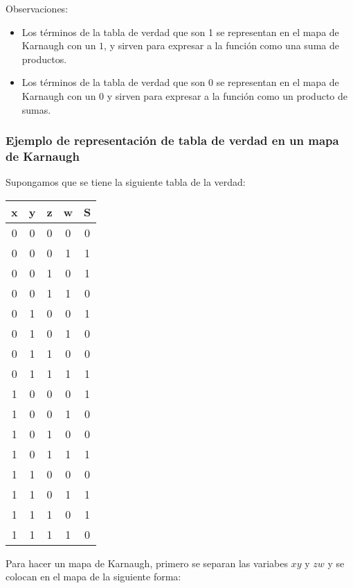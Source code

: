 \begin{mdframed}[backgroundcolor=gray!10,linewidth=0]
    Observaciones:
    \begin{itemize}
        \item Los términos de la tabla de verdad que son 1 se representan en el mapa de Karnaugh con un $1$, y sirven para expresar a la función como una suma de productos.
        \item Los términos de la tabla de verdad que son 0 se representan en el mapa de Karnaugh con un $0$ y sirven para expresar a la función como un producto de sumas.
    \end{itemize}
\end{mdframed}

\newpage
\subsubsection{Ejemplo de representación de tabla de verdad en un mapa de Karnaugh}

Supongamos que se tiene la siguiente tabla de la verdad:

\begin{table}[h]
    \centering
    \begin{tabular}{ccccc}
        \toprule
        \textbf{x} & \textbf{y} & \textbf{z} & \textbf{w} & \textbf{S}\\
        \midrule
        0 & 0 & 0 & 0 & 0\\
        0 & 0 & 0 & 1 & 1\\
        0 & 0 & 1 & 0 & 1\\
        0 & 0 & 1 & 1 & 0\\
        0 & 1 & 0 & 0 & 1\\
        0 & 1 & 0 & 1 & 0\\
        0 & 1 & 1 & 0 & 0\\
        0 & 1 & 1 & 1 & 1\\
        1 & 0 & 0 & 0 & 1\\
        1 & 0 & 0 & 1 & 0\\
        1 & 0 & 1 & 0 & 0\\
        1 & 0 & 1 & 1 & 1\\
        1 & 1 & 0 & 0 & 0\\
        1 & 1 & 0 & 1 & 1\\
        1 & 1 & 1 & 0 & 1\\
        1 & 1 & 1 & 1 & 0\\
        \bottomrule
    \end{tabular}
\end{table}
Para hacer un mapa de Karnaugh, primero se separan las variabes $xy$ y $zw$ y se colocan en el mapa de la siguiente forma:

